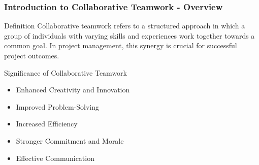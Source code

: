 \documentclass[aspectratio=169]{beamer}
\begin{document}
\frame{\titlepage}

\begin{frame}[fragile]
    \frametitle{Introduction to Collaborative Teamwork - Overview}
    
    \begin{block}{Definition}
        Collaborative teamwork refers to a structured approach in which a group of individuals with varying skills and experiences work together towards a common goal. In project management, this synergy is crucial for successful project outcomes.
    \end{block}
    
    \begin{block}{Significance of Collaborative Teamwork}
        \begin{itemize}
            \item Enhanced Creativity and Innovation
            \item Improved Problem-Solving
            \item Increased Efficiency
            \item Stronger Commitment and Morale
            \item Effective Communication
        \end{itemize}
    \end{block}
\end{frame}
\end{document}
